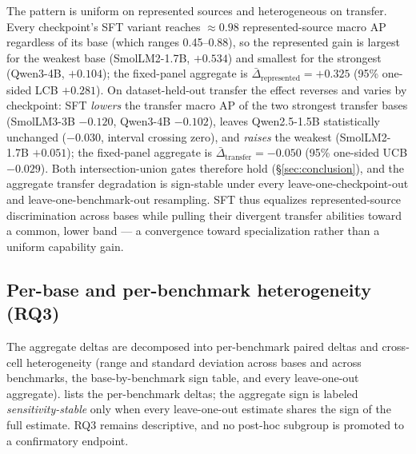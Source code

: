 \documentclass[sigconf,nonacm]{acmart}
\begin{document}
The pattern is uniform on represented sources and heterogeneous on transfer. Every checkpoint's SFT variant reaches $\approx\!0.98$ represented-source macro AP regardless of its base (which ranges 0.45--0.88), so the represented gain is largest for the weakest base (SmolLM2-1.7B, $+0.534$) and smallest for the strongest (Qwen3-4B, $+0.104$); the fixed-panel aggregate is $\bar\Delta_{\text{represented}}=+0.325$ (95\% one-sided LCB $+0.281$). On dataset-held-out transfer the effect reverses and varies by checkpoint: SFT \emph{lowers} the transfer macro AP of the two strongest transfer bases (SmolLM3-3B $-0.120$, Qwen3-4B $-0.102$), leaves Qwen2.5-1.5B statistically unchanged ($-0.030$, interval crossing zero), and \emph{raises} the weakest (SmolLM2-1.7B $+0.051$); the fixed-panel aggregate is $\bar\Delta_{\text{transfer}}=-0.050$ (95\% one-sided UCB $-0.029$). Both intersection-union gates therefore hold (\S\ref{sec:conclusion}), and the aggregate transfer degradation is sign-stable under every leave-one-checkpoint-out and leave-one-benchmark-out resampling. SFT thus equalizes represented-source discrimination across bases while pulling their divergent transfer abilities toward a common, lower band --- a convergence toward specialization rather than a uniform capability gain.

\begin{table}[t]
\centering
\small
\caption{Primary fixed-panel result. Base and mean-SFT benchmark-macro AP, with paired base-to-SFT deltas and one-sided 95\% intervals, for the represented-source and dataset-held-out transfer regimes. The last row is the fixed-panel aggregate $\theta$. All values are filled from \texttt{artifacts/paper\_a\_sft/analysis} after the locked run; full five-seed values per cell are in the appendix.}
\label{tab:primary}

\end{table}

\subsection{Per-base and per-benchmark heterogeneity (RQ3)}
\label{subsec:heterogeneity}

The aggregate deltas are decomposed into per-benchmark paired deltas and cross-cell heterogeneity (range and standard deviation across bases and across benchmarks, the base-by-benchmark sign table, and every leave-one-out aggregate).  lists the per-benchmark deltas; the aggregate sign is labeled \emph{sensitivity-stable} only when every leave-one-out estimate shares the sign of the full estimate. RQ3 remains descriptive, and no post-hoc subgroup is promoted to a confirmatory endpoint.
\end{document}
